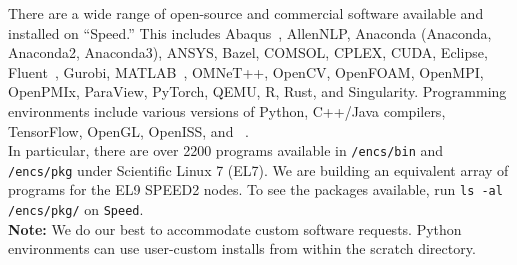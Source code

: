 
There are a wide range of open-source and commercial software available and installed on ``Speed.'' 
This includes Abaqus~\cite{abaqus}, AllenNLP, Anaconda (Anaconda, Anaconda2, Anaconda3), ANSYS, Bazel, 
COMSOL, CPLEX, CUDA, Eclipse, Fluent~\cite{fluent}, Gurobi, MATLAB~\cite{matlab,scholarpedia-matlab}, 
OMNeT++, OpenCV, OpenFOAM, OpenMPI, OpenPMIx, ParaView, PyTorch, QEMU, R, Rust, and Singularity.
Programming environments include various versions of Python, C++/Java compilers, TensorFlow, OpenGL, OpenISS, and {\marf}~\cite{marf}.\\

In particular, there are over 2200 programs available in \texttt{/encs/bin} and \texttt{/encs/pkg} under Scientific Linux 7 (EL7).
We are building an equivalent array of programs for the EL9 SPEED2 nodes. To see the packages available, run \texttt{ls -al /encs/pkg/} on \texttt{Speed}.\\

\noindent \textbf{Note:} We do our best to accommodate custom software requests. Python environments can use user-custom installs 
from within the scratch directory.\\